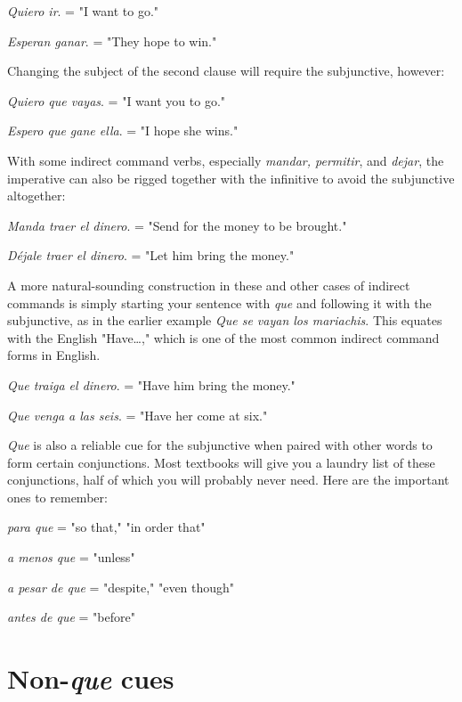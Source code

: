 \documentclass[14pt,a4paper,oneside]{memoir}
\newcommand{\bsk}{\vspace{20pt}}
\newcommand{\indu}{\hspace{20pt}}
\begin{document}
\bsk

\indu \emph{Quiero ir}. = "I want to go."

\indu \emph{Esperan ganar}. = "They hope to win."

\bsk

Changing the subject of the second clause will require the subjunctive,
however:

\bsk

\indu \emph{Quiero que vayas}. = "I want you to go."

\indu \emph{Espero que gane ella}. = "I hope she wins."

\bsk

With some indirect command verbs, especially \emph{mandar, permitir}, and \emph{dejar}, the imperative can also be rigged together with the
infinitive to avoid the subjunctive altogether:

\bsk

\indu \emph{Manda traer el dinero}. = "Send for the money to be brought."

\indu \emph{Déjale traer el dinero}. = "Let him bring the money."

\bsk

A more natural-sounding construction in these and other cases of indirect commands is simply starting your sentence with \emph{que} and following it with the subjunctive, as in the earlier example \emph{Que se vayan los
	mariachis}. This equates with the English "Have\ldots{}," which is one of
the most common indirect command forms in English.

\bsk

\indu \emph{Que traiga el dinero}. = "Have him bring the money."

\indu \emph{Que venga a las seis}. = "Have her come at six."

\bsk

\emph{Que} is also a reliable cue for the subjunctive when paired with
other words to form certain conjunctions. Most textbooks will give
you a laundry list of these conjunctions, half of which you will probably never need. Here are the important ones to remember:

\bsk

\indu \emph{para que} = "so that," "in order that"

\indu \emph{a menos que} = "unless"

\indu \emph{a pesar de que} = "despite," "even though"

\indu \emph{antes de que} = "before"

\section{Non-\emph{que} cues}
\end{document}
